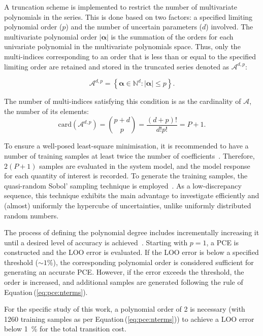 A truncation scheme is implemented to restrict the number of multivariate polynomials in the series. This is done based on two factors: a specified limiting polynomial order ($p$) and the number of uncertain parameters ($d$) involved. The multivariate polynomial order $|\bm{\alpha}|$ is the summation of the orders for each univariate polynomial in the multivariate polynomials space. Thus, only the multi-indices corresponding to an order that is less than or equal to the specified limiting order are retained and stored in the truncated series denoted as $\mathcal{A}^{d,p}$:

\begin{equation}
\mathcal{A}^{d,p} = \left \{ \bm{\alpha} \in \mathbb{N}^d : |\bm{\alpha}| \leq p \right \}. 
\end{equation}

The number of multi-indices satisfying this condition is as the cardinality of $\mathcal{A}$, \ie the number of its elements:
\begin{equation}
\mathrm{card} \left( \mathcal{A}^{d,p} \right) = {p + d \choose p} = \dfrac{\left( d + p \right) !}{d! p!} = P + 1.
\label{eq:pce:nterms}
\end{equation}

To ensure a well-posed least-square minimisation, it is recommended to have a number of training samples at least twice the number of coefficients~\cite{Sudret2014}. Therefore, $2 \left( P+1 \right)$ samples are evaluated in the system model, and the model response for each quantity of interest is recorded. To generate the training samples, the quasi-random Sobol' sampling technique is employed~\cite{bratley2003implementing}. As a low-discrepancy sequence, this technique exhibits the main advantage to investigate efficiently and (almost) uniformly the hypercube of uncertainties, unlike uniformly distributed random numbers.

The process of defining the polynomial degree includes incrementally increasing it until a desired level of accuracy is achieved~\cite{coppitters2022rheia}. Starting with $p=1$, a PCE is constructed and the \gls{LOO} error is evaluated. If the \gls{LOO} error is below a specified threshold ($\sim 1\%$), the corresponding polynomial order is considered sufficient for generating an accurate PCE. However, if the error exceeds the threshold, the order is increased, and additional samples are generated following the rule of Equation\,(\ref{eq:pce:nterms}).

For the specific study of this work, a polynomial order of 2 is necessary (with 1260 training samples as per Equation\,(\ref{eq:pce:nterms})) to achieve a \gls{LOO} error below \SI{1}{\%} for the total transition cost.


